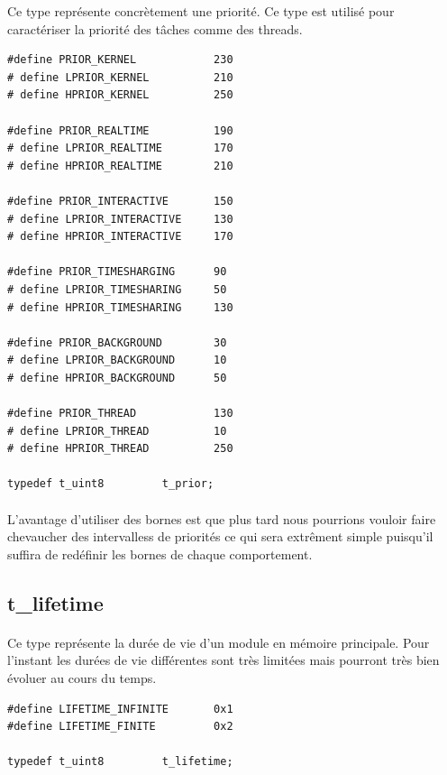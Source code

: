 \documentclass[10pt,a4wide]{article}
\begin{document}
Ce type repr\'esente concr\`etement une priorit\'e. Ce type est utilis\'e
pour caract\'eriser la priorit\'e des t\^aches comme des threads.

\begin{verbatim}
#define PRIOR_KERNEL            230
# define LPRIOR_KERNEL          210
# define HPRIOR_KERNEL          250

#define PRIOR_REALTIME          190
# define LPRIOR_REALTIME        170
# define HPRIOR_REALTIME        210

#define PRIOR_INTERACTIVE       150
# define LPRIOR_INTERACTIVE     130
# define HPRIOR_INTERACTIVE     170

#define PRIOR_TIMESHARGING      90
# define LPRIOR_TIMESHARING     50
# define HPRIOR_TIMESHARING     130

#define PRIOR_BACKGROUND        30
# define LPRIOR_BACKGROUND      10
# define HPRIOR_BACKGROUND      50

#define PRIOR_THREAD            130
# define LPRIOR_THREAD          10
# define HPRIOR_THREAD          250

typedef t_uint8         t_prior;
\end{verbatim}

\paragraph{}

L'avantage d'utiliser des bornes est que plus tard nous pourrions vouloir
faire chevaucher des intervalless de priorit\'es ce qui sera extr\^ement simple
puisqu'il suffira de red\'efinir les bornes de chaque comportement.

\subsection{t\_lifetime}

\paragraph{}

Ce type repr\'esente la dur\'ee de vie d'un module en m\'emoire principale.
Pour l'instant les dur\'ees de vie diff\'erentes sont tr\`es limit\'ees mais
pourront tr\`es bien \'evoluer au cours du temps.

\begin{verbatim}
#define LIFETIME_INFINITE       0x1
#define LIFETIME_FINITE         0x2

typedef t_uint8         t_lifetime;
\end{verbatim}
\end{document}
